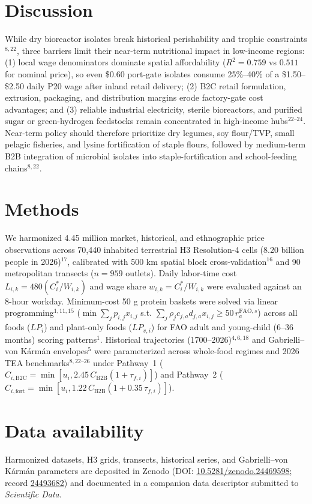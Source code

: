 \documentclass[11pt,a4paper]{article}
\begin{document}
\section*{Discussion}
While dry bioreactor isolates break historical perishability and trophic constraints$^{8,22}$, three barriers limit their near-term nutritional impact in low-income regions: (1) local wage denominators dominate spatial affordability ($R^2 = 0.759$ vs $0.511$ for nominal price), so even \$0.60 port-gate isolates consume 25\%--40\% of a \$1.50--\$2.50 daily P20 wage after inland retail delivery; (2) B2C retail formulation, extrusion, packaging, and distribution margins erode factory-gate cost advantages; and (3) reliable industrial electricity, sterile bioreactors, and purified sugar or green-hydrogen feedstocks remain concentrated in high-income hubs$^{22\text{--}24}$. Near-term policy should therefore prioritize dry legumes, soy flour/TVP, small pelagic fisheries, and lysine fortification of staple flours, followed by medium-term B2B integration of microbial isolates into staple-fortification and school-feeding chains$^{8,22}$.

\section*{Methods}
We harmonized 4.45 million market, historical, and ethnographic price observations across 70,440 inhabited terrestrial H3 Resolution-4 cells (8.20 billion people in 2026)$^{17}$, calibrated with 500 km spatial block cross-validation$^{16}$ and 90 metropolitan transects ($n = 959$ outlets). Daily labor-time cost $L_{i,k} = 480(C_i^*/W_{i,k})$ and wage share $w_{i,k} = C_i^*/W_{i,k}$ were evaluated against an 8-hour workday. Minimum-cost 50 g protein baskets were solved via linear programming$^{1,11,15}$ ($\min \sum_j p_{i,j}x_{i,j}$ s.t. $\sum_j \rho_j c_{j,a} d_{j,a} x_{i,j} \ge 50\,r_a^{\mathrm{FAO},s}$) across all foods ($LP_i$) and plant-only foods ($LP_{v,i}$) for FAO adult and young-child (6--36 months) scoring patterns$^1$. Historical trajectories (1700--2026)$^{4,6,18}$ and Gabrielli--von K\'arm\'an envelopes$^5$ were parameterized across whole-food regimes and 2026 TEA benchmarks$^{8,22\text{--}26}$ under Pathway~1 ($C_{i,\mathrm{B2C}} = \min[u_i, 2.45\,C_{\mathrm{B2B}}(1+\tau_{f,i})]$) and Pathway~2 ($C_{i,\mathrm{fort}} = \min[u_i, 1.22\,C_{\mathrm{B2B}}(1+0.35\,\tau_{f,i})]$).

\section*{Data availability}
Harmonized datasets, H3 grids, transects, historical series, and Gabrielli--von K\'arm\'an parameters are deposited in Zenodo (DOI: \href{https://doi.org/10.5281/zenodo.24469598}{10.5281/zenodo.24469598}; record \href{https://zenodo.org/records/24493682}{24493682}) and documented in a companion data descriptor submitted to \emph{Scientific Data}.
\end{document}
